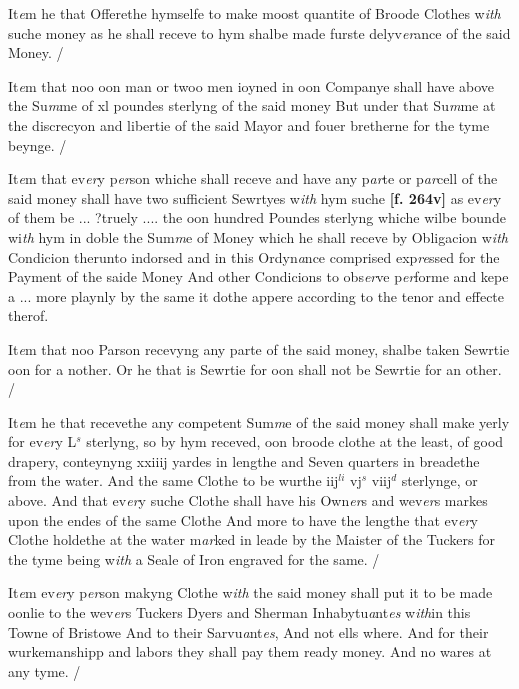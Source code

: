 \documentclass[a4paper,12pt]{article}
\begin{document}
It\textit{e}m he that Offerethe hymselfe to make moost quantite of Broode Clothes w\textit{ith} suche money as he shall receve to hym shalbe made furste delyv\textit{er}ance of the said Money. /

It\textit{e}m that noo oon man or twoo men ioyned in oon Companye shall have above the Su\textit{m}me of xl poundes sterlyng of the said money But under that Su\textit{m}me at the discrecyon and libertie of the said Mayor and fouer bretherne for the tyme beynge. /

It\textit{e}m that ev\textit{er}y p\textit{er}son whiche shall receve and have any p\textit{ar}te or p\textit{ar}cell of the said money shall have two sufficient Sewrtyes w\textit{ith} hym suche \textbf{[f. 264v]} as ev\textit{er}y of them be ... ?truely .... the oon hundred Poundes sterlyng whiche wilbe bounde wi\textit{th} hym in doble the Sum\textit{m}e of Money which he shall receve by Obligacion w\textit{ith} Condicion therunto indorsed and in this Ordyn\textit{a}nce comprised exp\textit{re}ssed for the Payment of the saide Money And other Condicions to obs\textit{er}ve p\textit{er}forme and kepe a ... more playnly by the same it dothe appere according to the tenor and effecte therof.

It\textit{e}m that noo Parson recevyng any parte of the said money, shalbe taken Sewrtie oon for a nother. Or he that is Sewrtie for oon shall not be Sewrtie for an other. /

It\textit{e}m he that recevethe any competent Sum\textit{m}e of the said money shall make yerly for ev\textit{er}y L$^{s}$ sterlyng, so by hym receved, oon broode clothe at the least, of good drapery, conteynyng xxiiij yardes in lengthe and Seven quarters in breadethe from the water. And the same Clothe to be wurthe iij$^{li}$ vj$^{s}$ viij$^{d}$ sterlynge, or above. And that ev\textit{er}y suche Clothe shall have his Own\textit{er}s and wev\textit{er}s markes upon the endes of the same Clothe And more to have the lengthe that ev\textit{er}y Clothe holdethe at the water m\textit{ar}ked in leade by the Maister of the Tuckers for the tyme being w\textit{ith} a Seale of Iron engraved for the same. / 

It\textit{e}m ev\textit{er}y p\textit{er}son makyng Clothe w\textit{ith} the said money shall put it to be made oonlie to the wev\textit{er}s Tuckers Dyers and Sherman Inhabytu\textit{a}nt\textit{es} w\textit{ith}in this Towne of Bristowe And to their Sarvu\textit{a}nt\textit{es}, And not ells where. And for their wurkemanshipp and labors they shall pay them ready money. And no wares at any tyme. /
\end{document}
